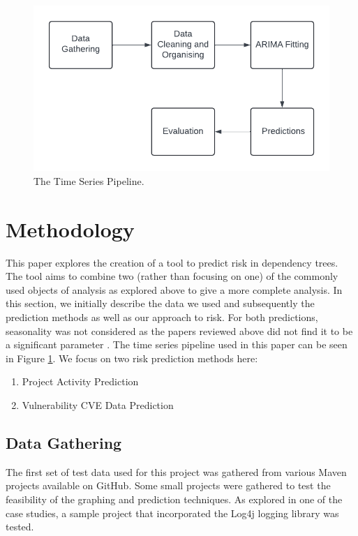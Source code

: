 \documentclass[conference]{IEEEtran}
\begin{document}
\begin{figure}
\begin{center}
    \includegraphics[scale=0.5]{Pipeline.png}
    \caption{The Time Series Pipeline.}
    \label{fig:pipeline}
\end{center}
\end{figure}

\section{Methodology}
This paper explores the creation of a tool to predict risk in dependency trees. The tool aims to combine two (rather than focusing on one) of the commonly used objects of analysis as explored above to give a more complete analysis. In this section, we initially describe the data we used and subsequently the prediction methods as well as our approach to risk. For both predictions, seasonality was not considered as the papers reviewed above did not find it to be a significant parameter \cite{roumani_time_2015}. The time series pipeline used in this paper can be seen in Figure \ref{fig:pipeline}. We focus on two risk prediction methods here: 

\begin{enumerate}
    \item Project Activity Prediction
    \item Vulnerability CVE Data Prediction
\end{enumerate}

\subsection{Data Gathering}
The first set of test data used for this project was gathered from various Maven projects available on GitHub. Some small projects were gathered to test the feasibility of the graphing and prediction techniques. As explored in one of the case studies, a sample project that incorporated the Log4j logging library was tested. 
\end{document}
